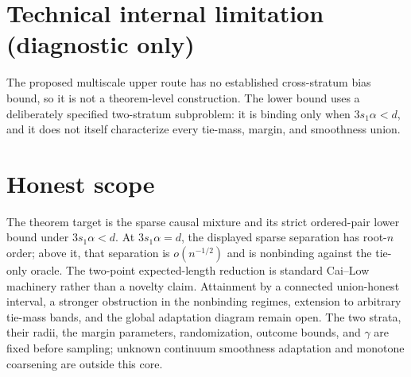 \documentclass{article}
\begin{document}
\section*{Technical internal limitation (diagnostic only)}

The proposed multiscale upper route has no established cross-stratum bias bound, so it is not a theorem-level construction. The lower bound uses a deliberately specified two-stratum subproblem: it is binding only when \(3s_1\alpha<d\), and it does not itself characterize every tie-mass, margin, and smoothness union.

\section{Honest scope}

The theorem target is the sparse causal mixture and its strict ordered-pair lower bound under \(3s_1\alpha<d\). At \(3s_1\alpha=d\), the displayed sparse separation has root-\(n\) order; above it, that separation is \(o(n^{-1/2})\) and is nonbinding against the tie-only oracle. The two-point expected-length reduction is standard Cai--Low machinery rather than a novelty claim. Attainment by a connected union-honest interval, a stronger obstruction in the nonbinding regimes, extension to arbitrary tie-mass bands, and the global adaptation diagram remain open. The two strata, their radii, the margin parameters, randomization, outcome bounds, and \(\gamma\) are fixed before sampling; unknown continuum smoothness adaptation and monotone coarsening are outside this core.
\end{document}
